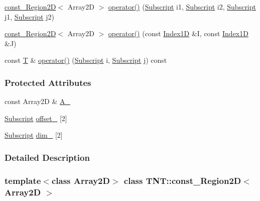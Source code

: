\begin{DoxyCompactItemize}
\item 
\hyperlink{class_t_n_t_1_1const___region2_d}{const\_\-Region2D}$<$ Array2D $>$ \hyperlink{class_t_n_t_1_1const___region2_d_afd31401751db76deb434f6eb4d4da73d}{operator()} (\hyperlink{namespace_t_n_t_af22e3f1460e145c04ce4e7d701e4c1c1}{Subscript} i1, \hyperlink{namespace_t_n_t_af22e3f1460e145c04ce4e7d701e4c1c1}{Subscript} i2, \hyperlink{namespace_t_n_t_af22e3f1460e145c04ce4e7d701e4c1c1}{Subscript} j1, \hyperlink{namespace_t_n_t_af22e3f1460e145c04ce4e7d701e4c1c1}{Subscript} j2)
\item 
\hyperlink{class_t_n_t_1_1const___region2_d}{const\_\-Region2D}$<$ Array2D $>$ \hyperlink{class_t_n_t_1_1const___region2_d_a23466cf24de2cef0db8b2ba8d4a2c7df}{operator()} (const \hyperlink{class_t_n_t_1_1_index1_d}{Index1D} \&I, const \hyperlink{class_t_n_t_1_1_index1_d}{Index1D} \&J)
\item 
const \hyperlink{class_t_n_t_1_1const___region2_d_a32134e56beb7ec872959e2446253aef6}{T} \& \hyperlink{class_t_n_t_1_1const___region2_d_af616a99bad43c6bab4e7fc3edae05ec0}{operator()} (\hyperlink{namespace_t_n_t_af22e3f1460e145c04ce4e7d701e4c1c1}{Subscript} i, \hyperlink{namespace_t_n_t_af22e3f1460e145c04ce4e7d701e4c1c1}{Subscript} j) const 
\end{DoxyCompactItemize}
\subsubsection*{Protected Attributes}
\begin{DoxyCompactItemize}
\item 
const Array2D \& \hyperlink{class_t_n_t_1_1const___region2_d_a714d4a4f74d4869914a16638be66106e}{A\_\-}
\item 
\hyperlink{namespace_t_n_t_af22e3f1460e145c04ce4e7d701e4c1c1}{Subscript} \hyperlink{class_t_n_t_1_1const___region2_d_a45945dd289e38180719724e457b56076}{offset\_\-} \mbox{[}2\mbox{]}
\item 
\hyperlink{namespace_t_n_t_af22e3f1460e145c04ce4e7d701e4c1c1}{Subscript} \hyperlink{class_t_n_t_1_1const___region2_d_a26098b3d9738f86a5ef5bdd1f88117d7}{dim\_\-} \mbox{[}2\mbox{]}
\end{DoxyCompactItemize}


\subsubsection{Detailed Description}
\subsubsection*{template$<$class Array2D$>$ class TNT::const\_\-Region2D$<$ Array2D $>$}



